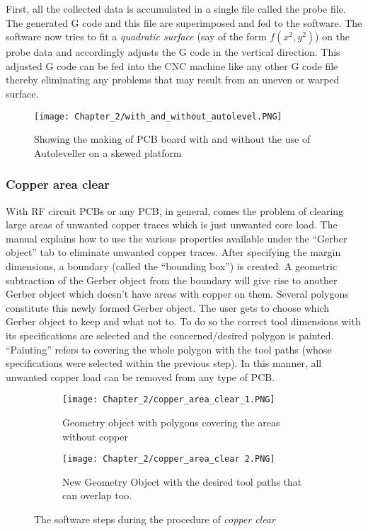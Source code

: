 First, all the collected data is accumulated in a single file called the probe file. The generated G code and this file are superimposed and fed to the software. The software now tries to fit a \textit{quadratic surface} (say of the form $f(x^{2},y^{2})$) on the probe data and accordingly adjusts the G code in the vertical direction. This adjusted G code can be fed into the CNC machine like any other G code file thereby eliminating any problems that may result from an uneven or warped surface.

\begin{figure}[h]
 \centering
 \texttt{[image: Chapter\_2/with\_and\_without\_autolevel.PNG]}
 \caption{Showing the making of PCB board with and
  without the use of Autoleveller on a skewed platform}
 \label{fig:with_without_auto}
\end{figure}

\subsubsection*{Copper area clear}

With RF circuit PCBs or any PCB, in general, comes the problem of clearing large areas of unwanted copper traces which is just unwanted core load. The manual explains how to use the various properties available under the “Gerber object” tab to eliminate unwanted copper traces. After specifying the margin dimensions, a boundary (called the “bounding box”) is created. A geometric subtraction of the Gerber object from the boundary will give rise to another Gerber object which doesn’t have areas with copper on them. Several polygons constitute this newly formed Gerber object. The user gets to choose which Gerber object to keep and what not to. To do so the correct tool dimensions with its specifications are selected and the concerned/desired polygon is painted. “Painting” refers to covering the whole polygon with the tool paths (whose specifications were selected within the previous step). In this manner, all unwanted copper load can be removed from any type of PCB.

\begin{figure}[ht]
 \begin{subfigure}{0.5\textwidth}
  \texttt{[image: Chapter\_2/copper\_area\_clear\_1.PNG]}
  \caption{Geometry object with polygons covering the areas without copper}
  \label{fig:copper_clear_1}
 \end{subfigure}
 \begin{subfigure}{0.5\textwidth}
  \texttt{[image: Chapter\_2/copper\_area\_clear 2.PNG]}
  \caption{New Geometry Object with the desired tool paths that can overlap too.}
  \label{fig:copper_clear_2}
 \end{subfigure}

 \caption{The software steps during the procedure of \textit{copper clear}}
 \label{fig:copper_clear}
\end{figure}

